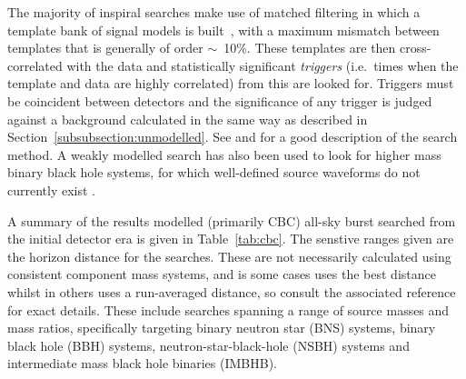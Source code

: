 The majority of inspiral searches make use of matched filtering in which a template bank of signal models is 
built~\cite{Owen:1996, Owen:1999}, with a maximum mismatch between templates that is generally of order 
$\sim$~10\%. These templates are then cross-correlated with the data and statistically significant
\textit{triggers} (i.e.\ times when the template and data are highly correlated) from this are looked for. 
Triggers must be coincident between detectors and the significance of any trigger is judged against a 
background calculated in the same way as described in Section~\ref{subsubsection:unmodelled}. See
\cite{Abbott:2005b} and \cite{2012PhRvD..85l2006A} for a good description of the search method. A weakly 
modelled search has also been used to look for higher mass binary black hole systems, for which well-defined 
source waveforms do not currently exist \cite{2008CQGra..25k4029K, 2012PhRvD..85j2004A}.

A summary of the results modelled (primarily CBC) all-sky burst searched from the initial detector era is 
given in Table~\ref{tab:cbc}. The senstive ranges given are the horizon distance for the searches. These are 
not necessarily calculated using consistent component mass systems, and is some cases uses the best distance 
whilst in others uses a run-averaged distance, so consult the associated reference for exact details. 
These include searches spanning a range of source masses and mass ratios, specifically targeting binary 
neutron star (BNS) systems, binary black hole (BBH) systems, neutron-star-black-hole (NSBH) systems and 
intermediate mass black hole binaries (IMBHB).

